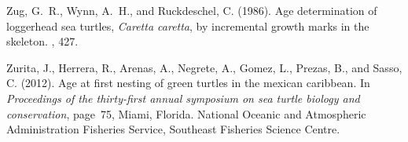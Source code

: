\documentclass{article}
\begin{document}
\begin{thebibliography}{}
Zug, G.~R., Wynn, A.~H., and Ruckdeschel, C. (1986).
\newblock Age determination of loggerhead sea turtles, \textit{Caretta
  caretta}, by incremental growth marks in the skeleton.
, 427.

Zurita, J., Herrera, R., Arenas, A., Negrete, A., Gomez, L., Prezas, B., and
  Sasso, C. (2012).
\newblock Age at first nesting of green turtles in the mexican caribbean.
\newblock In {\em Proceedings of the thirty-first annual symposium on sea
  turtle biology and conservation}, page~75, Miami, Florida. National Oceanic
  and Atmospheric Administration Fisheries Service, Southeast Fisheries Science
  Centre.

\end{thebibliography}
\end{document}
